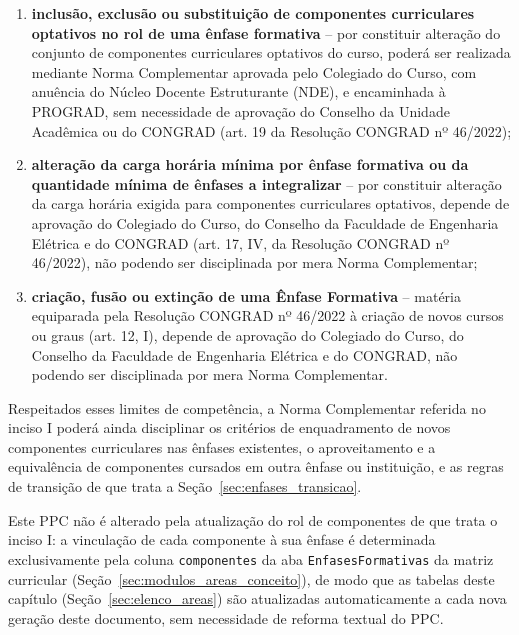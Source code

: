 \begin{enumerate}
    \item \textbf{inclusão, exclusão ou substituição de componentes curriculares optativos no rol de uma ênfase formativa} -- por constituir alteração do conjunto de componentes curriculares optativos do curso, poderá ser realizada mediante Norma Complementar aprovada pelo Colegiado do Curso, com anuência do Núcleo Docente Estruturante (NDE), e encaminhada à PROGRAD, sem necessidade de aprovação do Conselho da Unidade Acadêmica ou do CONGRAD (art. 19 da Resolução CONGRAD nº 46/2022);
    \item \textbf{alteração da carga horária mínima por ênfase formativa ou da quantidade mínima de ênfases a integralizar} -- por constituir alteração da carga horária exigida para componentes curriculares optativos, depende de aprovação do Colegiado do Curso, do Conselho da Faculdade de Engenharia Elétrica e do CONGRAD (art. 17, IV, da Resolução CONGRAD nº 46/2022), não podendo ser disciplinada por mera Norma Complementar;
    \item \textbf{criação, fusão ou extinção de uma Ênfase Formativa} -- matéria equiparada pela Resolução CONGRAD nº 46/2022 à criação de novos cursos ou graus (art. 12, I), depende de aprovação do Colegiado do Curso, do Conselho da Faculdade de Engenharia Elétrica e do CONGRAD, não podendo ser disciplinada por mera Norma Complementar.
\end{enumerate}

Respeitados esses limites de competência, a Norma Complementar referida no inciso I poderá ainda disciplinar os critérios de enquadramento de novos componentes curriculares nas ênfases existentes, o aproveitamento e a equivalência de componentes cursados em outra ênfase ou instituição, e as regras de transição de que trata a Seção~\ref{sec:enfases_transicao}.

Este PPC não é alterado pela atualização do rol de componentes de que trata o inciso I: a vinculação de cada componente à sua ênfase é determinada exclusivamente pela coluna \texttt{componentes} da aba \texttt{EnfasesFormativas} da matriz curricular (Seção~\ref{sec:modulos_areas_conceito}), de modo que as tabelas deste capítulo (Seção~\ref{sec:elenco_areas}) são atualizadas automaticamente a cada nova geração deste documento, sem necessidade de reforma textual do PPC.
